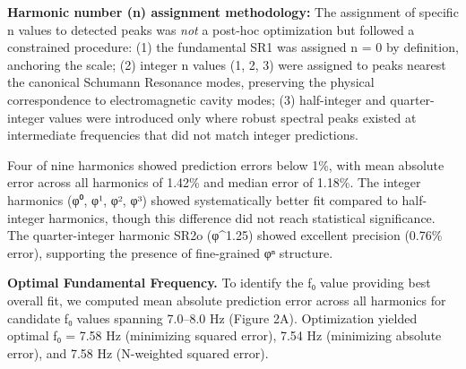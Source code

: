 \documentclass[11pt,a4paper]{article}
\begin{document}
\textbf{Harmonic number (n) assignment methodology:} The assignment of specific n values to detected peaks was \textit{not} a post-hoc optimization but followed a constrained procedure: (1) the fundamental SR1 was assigned n = 0 by definition, anchoring the scale; (2) integer n values (1, 2, 3) were assigned to peaks nearest the canonical Schumann Resonance modes, preserving the physical correspondence to electromagnetic cavity modes; (3) half-integer and quarter-integer values were introduced only where robust spectral peaks existed at intermediate frequencies that did not match integer predictions.

Four of nine harmonics showed prediction errors below 1\%, with mean absolute error across all harmonics of 1.42\% and median error of 1.18\%. The integer harmonics (φ⁰, φ¹, φ², φ³) showed systematically better fit compared to half-integer harmonics, though this difference did not reach statistical significance. The quarter-integer harmonic SR2o (φ\textasciicircum{}1.25) showed excellent precision (0.76\% error), supporting the presence of fine-grained φⁿ structure.

\textbf{Optimal Fundamental Frequency.}
To identify the f₀ value providing best overall fit, we computed mean absolute prediction error across all harmonics for candidate f₀ values spanning 7.0–8.0 Hz (Figure 2A). Optimization yielded optimal f₀ = 7.58 Hz (minimizing squared error), 7.54 Hz (minimizing absolute error), and 7.58 Hz (N-weighted squared error).
\end{document}
